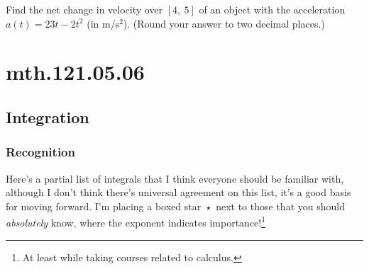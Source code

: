 \documentclass[12pt,addpoints, answers, fleqn]{exam}
\begin{document}
\begin{teacher}
\begin{questions}
 \begin{solution}
 \end{solution}
 
\question 	%

Find the net change in velocity over $\left[4, \ 5\right]$ of an object with the acceleration 
$a\left(t\right) = 23t - 2t^2$ (in m/s$^2$). (Round your answer to two decimal places.)
 
  \begin{solution}
 \end{solution}
 
\end{questions}
\end{teacher}
\vfill
\pagebreak


\section{mth.121.05.06}
\subsection{Integration}




\subsubsection{Recognition}
Here's a partial list of integrals that I think everyone should be familiar with, although I don't think there's universal agreement on this list, it's a good basis for moving forward. I'm placing a boxed star $\boxed{\star}$ next to those that you should \emph{absolutely} know, where the exponent indicates importance!\footnote{At least while taking courses related to calculus.}
\end{document}
